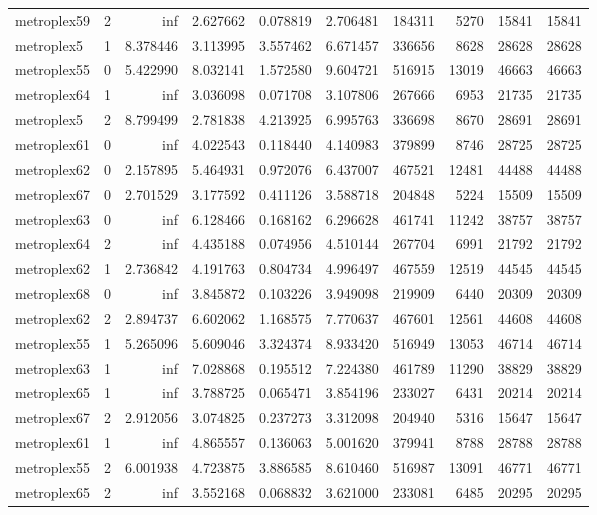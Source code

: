 \begin{longtable}{|l|r|r|r|r|r|r|r|r|r|}
metroplex59 & 2 & inf & 2.627662 & 0.078819 & 2.706481 & 184311 & 5270 & 15841 & 15841 \\
metroplex5 & 1 & 8.378446 & 3.113995 & 3.557462 & 6.671457 & 336656 & 8628 & 28628 & 28628 \\
metroplex55 & 0 & 5.422990 & 8.032141 & 1.572580 & 9.604721 & 516915 & 13019 & 46663 & 46663 \\
metroplex64 & 1 & inf & 3.036098 & 0.071708 & 3.107806 & 267666 & 6953 & 21735 & 21735 \\
metroplex5 & 2 & 8.799499 & 2.781838 & 4.213925 & 6.995763 & 336698 & 8670 & 28691 & 28691 \\
metroplex61 & 0 & inf & 4.022543 & 0.118440 & 4.140983 & 379899 & 8746 & 28725 & 28725 \\
metroplex62 & 0 & 2.157895 & 5.464931 & 0.972076 & 6.437007 & 467521 & 12481 & 44488 & 44488 \\
metroplex67 & 0 & 2.701529 & 3.177592 & 0.411126 & 3.588718 & 204848 & 5224 & 15509 & 15509 \\
metroplex63 & 0 & inf & 6.128466 & 0.168162 & 6.296628 & 461741 & 11242 & 38757 & 38757 \\
metroplex64 & 2 & inf & 4.435188 & 0.074956 & 4.510144 & 267704 & 6991 & 21792 & 21792 \\
metroplex62 & 1 & 2.736842 & 4.191763 & 0.804734 & 4.996497 & 467559 & 12519 & 44545 & 44545 \\
metroplex68 & 0 & inf & 3.845872 & 0.103226 & 3.949098 & 219909 & 6440 & 20309 & 20309 \\
metroplex62 & 2 & 2.894737 & 6.602062 & 1.168575 & 7.770637 & 467601 & 12561 & 44608 & 44608 \\
metroplex55 & 1 & 5.265096 & 5.609046 & 3.324374 & 8.933420 & 516949 & 13053 & 46714 & 46714 \\
metroplex63 & 1 & inf & 7.028868 & 0.195512 & 7.224380 & 461789 & 11290 & 38829 & 38829 \\
metroplex65 & 1 & inf & 3.788725 & 0.065471 & 3.854196 & 233027 & 6431 & 20214 & 20214 \\
metroplex67 & 2 & 2.912056 & 3.074825 & 0.237273 & 3.312098 & 204940 & 5316 & 15647 & 15647 \\
metroplex61 & 1 & inf & 4.865557 & 0.136063 & 5.001620 & 379941 & 8788 & 28788 & 28788 \\
metroplex55 & 2 & 6.001938 & 4.723875 & 3.886585 & 8.610460 & 516987 & 13091 & 46771 & 46771 \\
metroplex65 & 2 & inf & 3.552168 & 0.068832 & 3.621000 & 233081 & 6485 & 20295 & 20295 \\

\end{longtable}
